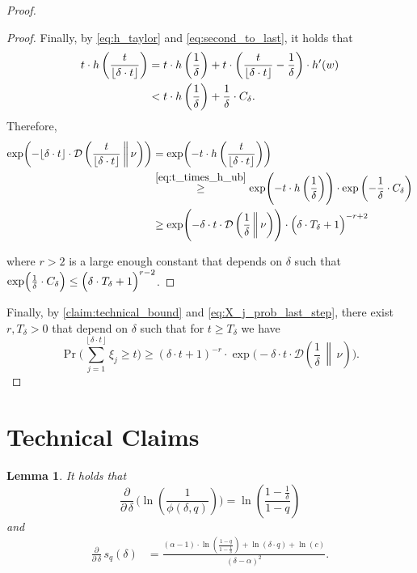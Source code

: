 \documentclass[letterpaper,11pt]{article}
\newenvironment{claimproof}{\begin{proof}\renewcommand{\qedsymbol}{$\lrcorner$}}{\end{proof}}
\newcommand{\floor}[1]{ {\left\lfloor #1 \right\rfloor}}
\newcommand{\1}[1]{\mathds{1}\left[#1\right]}
\newcommand{\D}[2]{\mathcal{D}\left(#1\, \middle\|\,#2 \right)}
\newtheorem{lemma}[theorem]{Lemma}
\begin{document}
\begin{proof}
\begin{claimproof}
			Finally, by \eqref{eq:h_taylor} and \eqref{eq:second_to_last}, it holds that
			\begin{align}
				t \cdot h\left( \frac{t}{\floor{\delta \cdot t}} \right) &= t \cdot h\left( \frac{1}{\delta} \right) + t \cdot \left( \frac{t}{\floor{\delta \cdot t}} - \frac{1}{\delta} \right) \cdot h'(w)\notag\\
											 &< t \cdot h\left( \frac{1}{\delta} \right) + \frac{1}{\delta} \cdot C_\delta.\label{eq:t_times_h_ub}
			\end{align}
			Therefore, 
			\begin{align*}
				\exp\biggl( - \floor{\delta \cdot t} \cdot \D{\frac{t}{\floor{\delta \cdot t}}}{\nu}\biggr) &= \exp \biggl( -t \cdot h\left( \frac{t}{\floor{\delta \cdot t}} \right)  \biggr)\\			
																							    &\overset{\eqref{eq:t_times_h_ub}}{\geq}  \exp \Biggl(-t \cdot h\left( \frac{1}{\delta} \right) \Biggr) \cdot \exp\left( -\frac{1}{\delta} \cdot C_\delta \right) \\
				&\geq  \exp \Biggl(-\delta \cdot t \cdot \D{\frac{1}{\delta}}{\nu}\Biggr) \cdot \Bigl( \delta \cdot T_\delta + 1 \Bigr)^{-r+2}\\
			\end{align*}
			
			where $r > 2$ is a large enough constant that depends on $\delta$ such that $\exp\Bigl( \frac{1}{\delta} \cdot C_\delta \Bigr) \leq \Bigl( \delta \cdot T_\delta + 1 \Bigr)^{r - 2}$.
		\end{claimproof}

		Finally, by \cref{claim:technical_bound} and \eqref{eq:X_j_prob_last_step}, there exist $r,T_\delta > 0$ that depend on $\delta$ such that for $t \geq T_\delta$ we have
		\begin{equation*}
			\Pr\biggl( \sum_{j = 1}^{\floor{\delta \cdot t}} \xi_j \geq t\biggr) \geq \left( \delta\cdot t + 1 \right) ^{-r} \cdot \exp\biggl( - \delta \cdot t \cdot \D{\frac{1}{\delta}}{\nu}\biggr).
		\end{equation*}
\end{proof}


 
\section{Technical Claims}
\label{sec:tech_claims}


\begin{lemma}
\label{lemma:z_s_deriv_formula}
	It holds that
	\begin{equation}\label{eq:z_deriv}
		\frac{\partial}{\partial\,\delta}\,\Biggl(\ln\left( \frac{1}{\phi(\delta,q)} \right)\Biggr) = \ln\left( \frac{1 - \frac{1}{\delta}}{1 - q} \right)
	\end{equation}
	and
	\begin{align}
		\frac{\partial}{\partial\,\delta}\,s_{q}(\delta)     &= \frac{(\alpha - 1) \cdot \ln\left( \frac{1 -q}{1 - \frac{1}{\delta}} \right) + \ln\left( \delta \cdot q \right) + \ln(c)}{(\delta - \alpha)^{2}}.\label{eq:s_deriv}	
	\end{align}	
\end{lemma}
\end{document}
